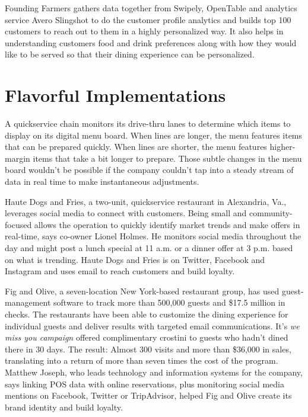 \documentclass[sigconf]{acmart}
\begin{document}
Founding Farmers gathers data together from Swipely, OpenTable and analytics service Avero Slingshot to do the customer profile analytics and builds top 100 customers to reach out to them in a highly personalized way. 
It also helps in understanding customers food and drink preferences along with how they would like to be served so that their dining experience can be personalized.\cite{KooserAmandaC.2013BD} 

\section{Flavorful Implementations}
A quickservice chain monitors its drive-thru lanes to determine which items to display on its digital menu board. When lines are longer, the menu features items that can be prepared quickly. When lines are shorter, the menu features higher-margin items that take a bit longer to prepare. Those subtle changes in the menu board wouldn't be possible if the company couldn't tap into a steady stream of data in real time to make instantaneous adjustments.\cite{www-restaurant}


Haute Dogs and Fries, a two-unit, quickservice restaurant in Alexandria, Va., leverages social media to connect with customers. Being small and community-focused allows the operation to quickly identify market trends and make offers in real-time, says co-owner Lionel Holmes. He monitors social media throughout the day and might post a lunch special at 11 a.m. or a dinner offer at 3 p.m. based on what is trending. Haute Dogs and Fries is on Twitter, Facebook and Instagram and uses email to reach customers and build loyalty.\cite{www-restaurant}


Fig and Olive, a seven-location New York-based restaurant group, has used guest-management software to track more than 500,000 guests and \$17.5 million in checks. The restaurants have been able to customize the dining experience for individual guests and deliver results with targeted email communications. It's \emph{we miss you campaign} offered complimentary crostini to guests who hadn't dined there in 30 days. The result: Almost 300 visits and more than \$36,000 in sales, translating into a return of more than seven times the cost of the program. Matthew Joseph, who leads technology and information systems for the company, says linking POS data with online reservations, plus monitoring social media mentions on Facebook, Twitter or TripAdvisor, helped Fig and Olive create its brand identity and build loyalty.\cite{www-restaurant}
\end{document}
